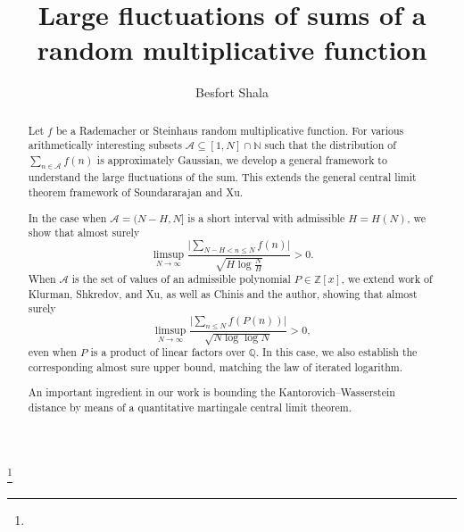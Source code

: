 \documentclass[11pt]{tran-l}
\theoremstyle{definition}
\theoremstyle{remark}
\numberwithin{equation}{section}
\begin{document}
\title[Large fluctuations of random multiplicative functions]{
Large fluctuations of 
sums of a random multiplicative function}


\author{Besfort Shala}
\address{Fry Building, School of Mathematics, Woodland Road, Bristol BS8 1UG, United Kingdom}
\curraddr{}
\thanks{}




\date{}

\dedicatory{}

\begin{abstract} Let $f$ be a Rademacher or Steinhaus random multiplicative function. For various arithmetically interesting subsets $\mathcal A\subseteq [1, N]\cap\mathbb N$ such that the distribution of $\sum_{n\in \mathcal A} f(n)$ is approximately Gaussian, we develop a general framework to understand the large fluctuations of the sum. This extends the general central limit theorem framework of Soundararajan and Xu.

In the case when $\mathcal A = (N-H, N]$ is a short interval with admissible $H=H(N)$, we show that almost surely
\begin{equation*}
    \limsup_{N\to\infty} \frac{\big\lvert\sum_{N-H<n\leq N} f(n)\big\rvert}{\sqrt{H\log \frac{N}H{}}}>0.
\end{equation*} When $\mathcal A$ is the set of values of an admissible polynomial $P\in\mathbb Z[x]$, we extend work of Klurman, Shkredov, and Xu, as well as Chinis and the author, showing that almost surely 
\begin{equation*}
   \limsup_{N\to\infty} \frac{\big\lvert\sum_{n\leq N} f(P(n))\big\rvert}{\sqrt{N \log\log N}}>0,
\end{equation*} even when $P$ is a product of linear factors over $\mathbb Q$. In this case, we also establish the corresponding almost sure upper bound, matching the law of iterated logarithm. 

An important ingredient in our work is bounding the Kantorovich--Wasserstein distance by means of a quantitative martingale central limit theorem. 
\end{abstract}

\maketitle
\end{document}
